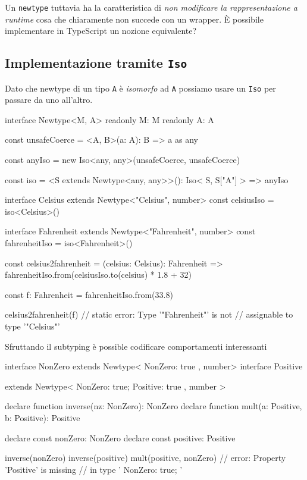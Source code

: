 \documentclass[12pt]{article}
\theoremstyle{definition}
\newenvironment{code}
  {\vspace{0.5cm} \VerbatimEnvironment\begin{typescriptcode}}
  {\end{typescriptcode} \vspace{0.2cm}}
\begin{document}
Un \texttt{newtype} tuttavia ha la caratteristica di \emph{non modificare la rappresentazione a runtime} cosa che chiaramente
non succede con un wrapper. È possibile implementare in TypeScript un nozione equivalente?

\subsection{Implementazione tramite \texttt{Iso}}

Dato che newtype di un tipo \texttt{A} è \emph{isomorfo} ad \texttt{A} possiamo usare un \texttt{Iso} per passare da uno
all'altro.

\begin{code}
interface Newtype<M, A> {
  readonly M: M
  readonly A: A
}

const unsafeCoerce = <A, B>(a: A): B => a as any

const anyIso = new Iso<any, any>(unsafeCoerce, unsafeCoerce)

const iso = <S extends Newtype<any, any>>(): Iso<
  S,
  S["A"]
> => anyIso

interface Celsius extends Newtype<"Celsius", number> {}
const celsiusIso = iso<Celsius>()

interface Fahrenheit extends Newtype<"Fahrenheit", number> {}
const fahrenheitIso = iso<Fahrenheit>()

const celsius2fahrenheit = (celsius: Celsius): Fahrenheit =>
  fahrenheitIso.from(celsiusIso.to(celsius) * 1.8 + 32)

const f: Fahrenheit = fahrenheitIso.from(33.8)

celsius2fahrenheit(f)
// static error: Type '"Fahrenheit"' is not
// assignable to type '"Celsius"'
\end{code}

Sfruttando il subtyping è possible codificare comportamenti interessanti

\begin{code}
interface NonZero
  extends Newtype<{ NonZero: true }, number> {}
interface Positive

  extends Newtype<
      { NonZero: true; Positive: true },
      number
    > {}

declare function inverse(nz: NonZero): NonZero
declare function mult(a: Positive, b: Positive): Positive

declare const nonZero: NonZero
declare const positive: Positive

inverse(nonZero)
inverse(positive)
mult(positive, nonZero)
// error: Property 'Positive' is missing
// in type '{ NonZero: true; }'
\end{code}
\end{document}
